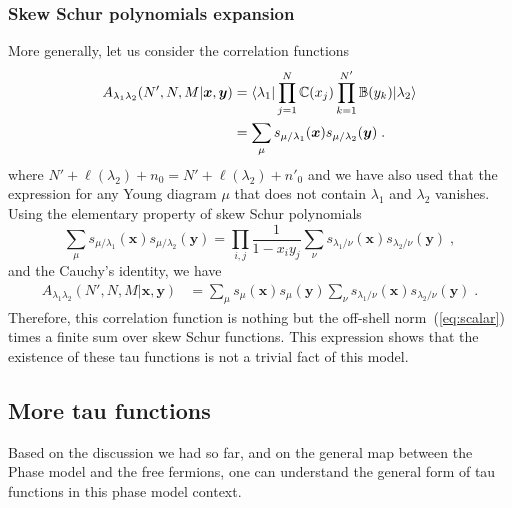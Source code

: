 \documentclass[a4paper,11pt]{amsart}
\begin{document}
\subsubsection{Skew Schur polynomials expansion}
More generally, let us consider the correlation functions 
\begin{equation}
\begin{split}
  A_{\lambda_1 \lambda_2}(N', N, M|\bm{x}, \bm{y}) & =
  \langle\lambda_1\rvert \prod_{j=1}^N \mathbb{C}(x_j)
  \prod_{k=1}^{N'} \mathbb{B}(y_k)\lvert\lambda_2\rangle \\
  & = \sum_{\mu} s_{\mu/\lambda_1}(\bm{x}) s_{\mu/\lambda_2}(\bm{y}) \; .
\end{split}
\end{equation}
where \(N' + \ell(\lambda_2) + n_0 = N' + \ell(\lambda_2) + n'_0\) and 
we have also used that the expression for any Young diagram
\(\mu\) that does not contain \(\lambda_1\) and \(\lambda_2\)
vanishes. Using the elementary property of skew Schur
polynomials~\cite{Macdonald:1998}
\begin{equation}
  \sum_{\mu} s_{\mu/\lambda_1}(\bm{x}) s_{\mu/\lambda_2}(\bm{y}) = \prod_{i,j}\frac{1}{1 - x_i y_j}
 \sum_\nu s_{\lambda_1/\nu}(\bm{x}) s_{\lambda_2/\nu}(\bm{y})\; ,
\end{equation}
and the Cauchy's identity, we have 
\begin{equation}
\begin{split}
  A_{\lambda_1 \lambda_2}(N', N, M|\bm{x}, \bm{y}) & =
 \sum_\mu s_{\mu}(\bm{x}) s_{\mu}(\bm{y})
 \sum_\nu s_{\lambda_1/\nu}(\bm{x}) s_{\lambda_2/\nu}(\bm{y})\; .
\end{split}
\end{equation}
Therefore, this correlation function is nothing but the off-shell
norm~(\ref{eq:scalar}) times a finite sum over skew Schur functions.
This expression shows that the existence of these tau functions is not
a trivial fact of this model.


\subsection{More tau functions}
Based on the discussion we had so far, and on the general map between 
the Phase model and the free fermions, one can understand the general form 
of tau functions in this phase model context. 
\end{document}
